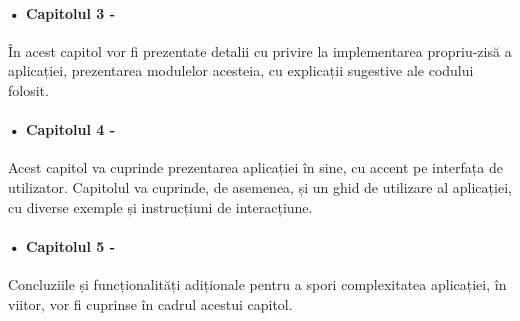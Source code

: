 \paragraph{•  Capitolul 3 -}În acest capitol vor fi prezentate detalii cu privire la implementarea propriu-zisă a aplicației, prezentarea modulelor acesteia, cu explicații sugestive ale codului folosit.

\paragraph{•  Capitolul 4 -}Acest capitol va cuprinde prezentarea aplicației în sine, cu accent pe interfața de utilizator. Capitolul va cuprinde, de asemenea, și un ghid de utilizare al aplicației, cu diverse exemple și instrucțiuni de interacțiune.

\paragraph{•  Capitolul 5 -}Concluziile și funcționalități adiționale pentru a spori complexitatea aplicației, în viitor, vor fi cuprinse în cadrul acestui capitol.

\label{chap:01}


